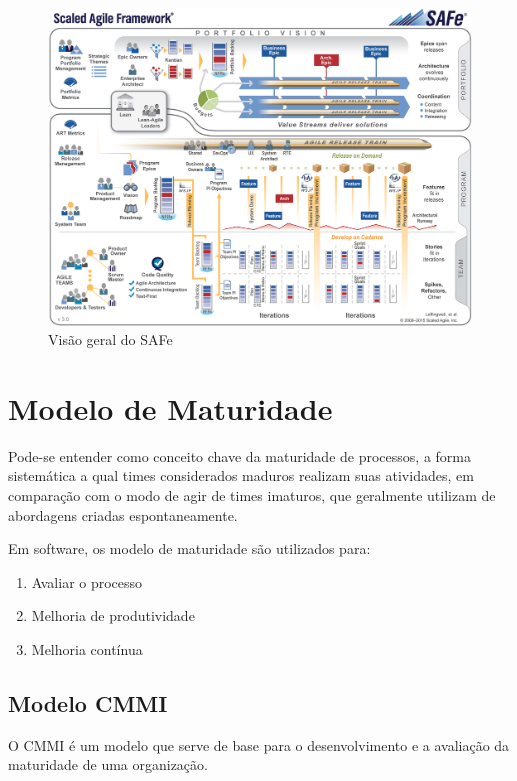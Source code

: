 \begin{figure}[H]
    \centering
  \includegraphics[keepaspectratio=true,scale=0.13]{figuras/SAFe_Big_Picture.eps}
    \caption{Visão geral do SAFe}
    \label{fig:safe}
\end{figure}

\section{Modelo de Maturidade}

Pode-se entender como conceito chave da maturidade de processos, a forma sistemática
a qual times considerados maduros realizam suas atividades, em comparação com o modo
de agir de times imaturos, que geralmente utilizam de abordagens criadas espontaneamente.

Em software, os modelo de maturidade são utilizados para:

\begin{enumerate}
  \item Avaliar o processo
  \item Melhoria de produtividade
  \item Melhoria contínua
\end{enumerate}

\subsection{Modelo CMMI}

O CMMI é um modelo que serve de base para o desenvolvimento e a avaliação da maturidade de uma organização.

